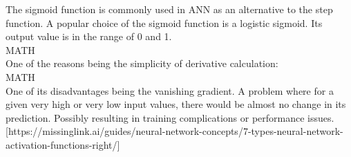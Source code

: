 The sigmoid function is commonly used in ANN as an alternative to the step function. A popular choice of the sigmoid function is a logistic sigmoid. Its output value is in the range of 0 and 1.\\

MATH\\

One of the reasons being the simplicity of derivative calculation:\\

MATH\\

One of its disadvantages being the vanishing gradient. A problem where for a given very high or very low input values, there would be almost no change in its prediction. Possibly resulting in training complications or performance issues.
[https://missinglink.ai/guides/neural-network-concepts/7-types-neural-network-activation-functions-right/]